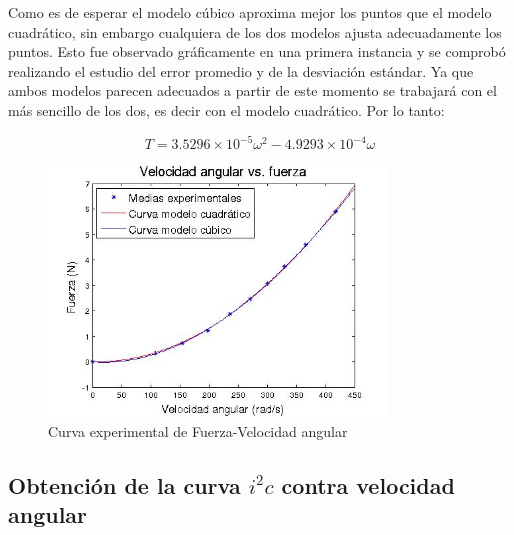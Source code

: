 \documentclass[main]{subfiles}
\begin{document}
Como es de esperar el modelo c\'ubico aproxima mejor los puntos que el modelo cuadr\'atico, sin embargo cualquiera de los dos modelos ajusta adecuadamente los puntos. Esto fue observado gr\'aficamente en una primera instancia y se comprob\'o realizando el estudio del error promedio y de la desviaci\'on est\'andar. Ya que ambos modelos parecen adecuados a partir de este momento se trabajar\'a con el m\'as sencillo de los dos, es decir con el modelo cuadr\'atico. Por lo tanto:

$$
T=3.5296\times10^{-5}\omega^2-4.9293\times10^{-4}\omega
$$


\begin{figure}[H]
  \vspace{-20pt}
  \begin{center}
    \includegraphics[width=0.8\textwidth]{./pics_motores/fvel.jpg}
  \end{center}
  \vspace{-20pt}
  \caption{Curva experimental de Fuerza-Velocidad angular}
  \label{fig:fvel}
  \vspace{-10pt}
\end{figure}

\subsection{Obtenci\'on de la curva $i^2c$ contra velocidad angular}
\end{document}
